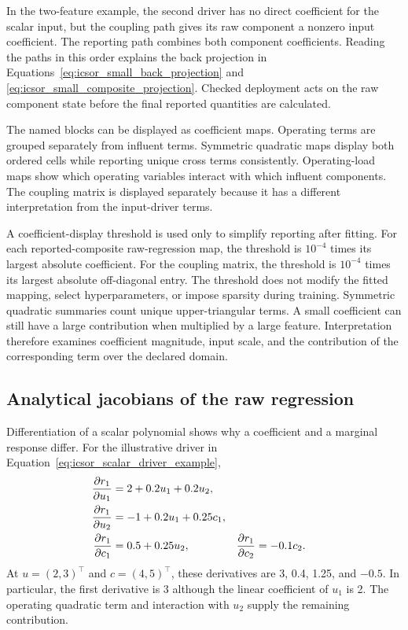 In the two-feature example, the second driver has no direct coefficient for the scalar input, but the coupling path gives its raw component a nonzero input coefficient. The reporting path combines both component coefficients. Reading the paths in this order explains the back projection in Equations~\eqref{eq:icsor_small_back_projection} and \eqref{eq:icsor_small_composite_projection}. Checked deployment acts on the raw component state before the final reported quantities are calculated.

The named blocks can be displayed as coefficient maps. Operating terms are grouped separately from influent terms. Symmetric quadratic maps display both ordered cells while reporting unique cross terms consistently. Operating-load maps show which operating variables interact with which influent components. The coupling matrix is displayed separately because it has a different interpretation from the input-driver terms.

A coefficient-display threshold is used only to simplify reporting after fitting. For each reported-composite raw-regression map, the threshold is \(10^{-4}\) times its largest absolute coefficient. For the coupling matrix, the threshold is \(10^{-4}\) times its largest absolute off-diagonal entry. The threshold does not modify the fitted mapping, select hyperparameters, or impose sparsity during training. Symmetric quadratic summaries count unique upper-triangular terms. A small coefficient can still have a large contribution when multiplied by a large feature. Interpretation therefore examines coefficient magnitude, input scale, and the contribution of the corresponding term over the declared domain.

\subsection{Analytical jacobians of the raw regression}

Differentiation of a scalar polynomial shows why a coefficient and a marginal response differ. For the illustrative driver in Equation~\eqref{eq:icsor_scalar_driver_example},
\begin{equation}
\equationname{Gradients of the illustrative scalar regression driver}
\label{eq:icsor_scalar_driver_derivatives}
\begin{aligned}
\frac{\partial r_1}{\partial u_1}&=2+0.2u_1+0.2u_2,\\
\frac{\partial r_1}{\partial u_2}&=-1+0.2u_1+0.25c_1,\\
\frac{\partial r_1}{\partial c_1}&=0.5+0.25u_2,
&\frac{\partial r_1}{\partial c_2}&=-0.1c_2.
\end{aligned}
\end{equation}
At \(u=(2,3)^\top\) and \(c=(4,5)^\top\), these derivatives are 3, 0.4, 1.25, and \(-0.5\). In particular, the first derivative is 3 although the linear coefficient of \(u_1\) is 2. The operating quadratic term and interaction with \(u_2\) supply the remaining contribution.

